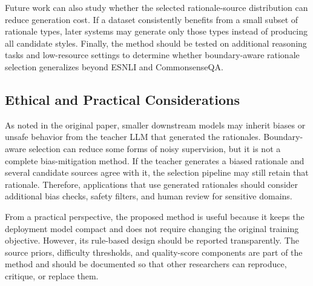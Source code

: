 Future work can also study whether the selected rationale-source distribution can reduce generation cost. If a dataset consistently benefits from a small subset of rationale types, later systems may generate only those types instead of producing all candidate styles. Finally, the method should be tested on additional reasoning tasks and low-resource settings to determine whether boundary-aware rationale selection generalizes beyond ESNLI and CommonsenseQA.

\subsection{Ethical and Practical Considerations}
\label{sec:discussion-ethics}

As noted in the original paper, smaller downstream models may inherit biases or unsafe behavior from the teacher LLM that generated the rationales. Boundary-aware selection can reduce some forms of noisy supervision, but it is not a complete bias-mitigation method. If the teacher generates a biased rationale and several candidate sources agree with it, the selection pipeline may still retain that rationale. Therefore, applications that use generated rationales should consider additional bias checks, safety filters, and human review for sensitive domains.

From a practical perspective, the proposed method is useful because it keeps the deployment model compact and does not require changing the original training objective. However, its rule-based design should be reported transparently. The source priors, difficulty thresholds, and quality-score components are part of the method and should be documented so that other researchers can reproduce, critique, or replace them.
